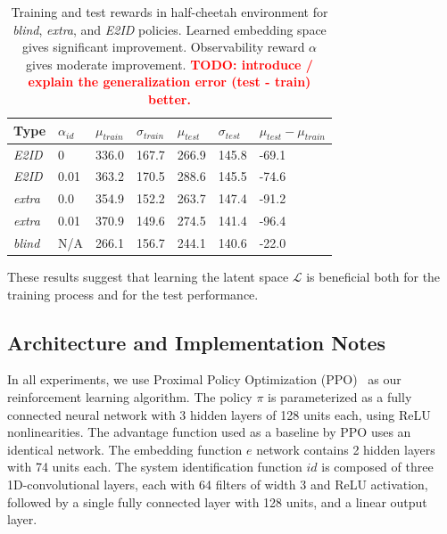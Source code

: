 \documentclass{article}
\newcommand{\TODO}[1]{\textcolor{red}{\textbf{TODO: #1}}}
\newcommand{\cL}{\mathcal{L}}
\newcommand{\blind}{\emph{blind}}
\newcommand{\extra}{\emph{extra}}
\newcommand{\embed}{\emph{E2ID}}
\newcommand{\embedfn}{e}
\newcommand{\idfn}{id}
\newcommand{\latent}{\cL}
\begin{document}
\begin{table}[ht]
\centering
\begin{tabular}{l l l l l l l}
Type & $\alpha_{id}$ & $\mu_{train}$ & $\sigma_{train}$& $\mu_{test}$ & $\sigma_{test}$ & $\mu_{test} - \mu_{train}$ \\
\hline
\embed{} & 0 & 336.0 & 167.7 & 266.9 & 145.8 & -69.1 \\
\embed{} & 0.01 & 363.2 & 170.5 & 288.6 & 145.5 & -74.6 \\
\extra{} & 0.0 & 354.9 & 152.2  & 263.7 & 147.4 & -91.2 \\
\extra{} & 0.01 & 370.9 & 149.6 & 274.5 & 141.4 & -96.4 \\
\blind{} & N/A & 266.1 & 156.7 & 244.1 & 140.6 & -22.0
\end{tabular}

\vspace{0.4cm}

\caption{
Training and test rewards in half-cheetah environment for \blind{}, \extra{}, and \embed{} policies.
Learned embedding space gives significant improvement.
Observability reward $\alpha$ gives moderate improvement.
\TODO{introduce / explain the generalization error (test - train) better.}
}
\label{cheetah}
\end{table}

These results suggest that learning the latent space $\latent$ is beneficial
both for the training process and for the test performance.


\subsection{Architecture and Implementation Notes}
\label{implementation}
In all experiments, we use Proximal Policy Optimization (PPO)~\citep{schulman-ppo} as our reinforcement learning algorithm.
The policy $\pi$ is parameterized as a fully connected neural network with 3 hidden layers of 128 units each, using ReLU nonlinearities.
The advantage function used as a baseline by PPO uses an identical network.
The embedding function $\embedfn$ network contains 2 hidden layers with 74 units each.
The system identification function $\idfn$ is composed of three 1D-convolutional layers, each with 64 filters of width 3 and ReLU activation, followed by a single fully connected layer with 128 units, and a linear output layer.
\end{document}
